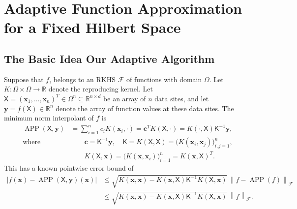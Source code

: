\documentclass[]{mcom-l}
\theoremstyle{remark}
\DeclareMathOperator{\APP}{APP}
\newcommand{\reals}{{\mathbb{R}}}
\newcommand{\mK}{\mathsf{K}}
\newcommand{\mX}{\mathsf{X}}
\newcommand{\bc}{{\boldsymbol{c}}}
\newcommand{\bx}{{\boldsymbol{x}}}
\newcommand{\by}{{\boldsymbol{y}}}
\newcommand{\cx}{{\Omega}}
\newcommand{\calf}{{\mathcal{F}}}
\def\abs#1{\ensuremath{\left \lvert #1 \right \rvert}}
\newcommand{\norm}[2][{}]{\ensuremath{\left \lVert #2 \right \rVert}_{#1}}
\newcommand{\bignorm}[2][{}]{\ensuremath{\bigl \lVert #2 \bigr \rVert}_{#1}}
\begin{document}
\section{Adaptive Function Approximation for a Fixed Hilbert Space} \label{sec:fixedF}

\subsection{The Basic Idea Our Adaptive Algorithm} \label{sec:basicIdea}
Suppose that $f$, belongs to an RKHS $\calf$ of functions with domain $\cx$.  Let $K: \Omega \times \Omega \to \reals$ denote the reproducing kernel.  Let $\mX = (\bx_1, \ldots, \bx_n)^T \in \cx^n \subseteq \reals^{n \times d}$ be an array of $n$ data sites, and let $\by  = f(\mX) \in \reals^n$ denote the array of function values at these data sites.  
The minimum norm interpolant of $f$ is 
\begin{subequations} \label{eq:RKHSAPP}
\begin{align} 
\APP(\mX,\by) &= \sum_{i=1}^n c_i K(\bx_i,\cdot) = \bc^T K(\mX,\cdot) =  K(\cdot, \mX) \mK^{-1} \by, \\
 \text{where } & \qquad \bc = \mK^{-1} \by, \quad \mK = K(\mX,\mX) = \bigl( K(\bx_i,\bx_j) \bigr)_{i,j=1}^n,  \\
& \qquad  K(\mX,\bx) = \bigl(K(\bx,\bx_i) \bigr)_{i=1}^n =  K(\bx, \mX)^T.
\end{align}
\end{subequations}
This has a known pointwise error bound of \cite{bibid}
\begin{align}
\label{eq:RKHSErrBd}
\abs{f(\bx) - \APP(\mX,\by)(\bx)} & \le \sqrt{K(\bx,\bx) - K(\bx,\mX) \mK^{-1} K(\mX,\bx)} \, \bignorm[\calf]{f - \APP(f)} \\
\nonumber
& \le \sqrt{K(\bx,\bx) - K(\bx,\mX) \mK^{-1} K(\mX,\bx) } \, \norm[\calf]{f} .
\end{align}
\end{document}
